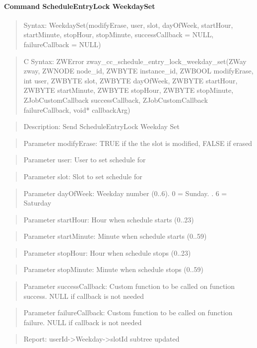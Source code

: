 \paragraph{Command ScheduleEntryLock WeekdaySet}
\begin{quote}Syntax: WeekdaySet(modifyErase, user, slot, dayOfWeek, startHour, startMinute, stopHour, stopMinute, successCallback = NULL, failureCallback = NULL)\end{quote}
\begin{quote}C Syntax: ZWError zway\_cc\_schedule\_entry\_lock\_weekday\_set(ZWay zway, ZWNODE node\_id, ZWBYTE instance\_id, ZWBOOL modifyErase, int user, ZWBYTE slot, ZWBYTE dayOfWeek, ZWBYTE startHour, ZWBYTE startMinute, ZWBYTE stopHour, ZWBYTE stopMinute, ZJobCustomCallback successCallback, ZJobCustomCallback failureCallback, void* callbackArg)\end{quote}
\begin{quote}Description: Send ScheduleEntryLock Weekday Set\end{quote}
\begin{quote}Parameter modifyErase: TRUE if the the slot is modified, FALSE if erased\end{quote}
\begin{quote}Parameter user: User to set schedule for\end{quote}
\begin{quote}Parameter slot: Slot to set schedule for\end{quote}
\begin{quote}Parameter dayOfWeek: Weekday number (0..6). 0 = Sunday. . 6 = Saturday\end{quote}
\begin{quote}Parameter startHour: Hour when schedule starts (0..23)\end{quote}
\begin{quote}Parameter startMinute: Minute when schedule starts (0..59)\end{quote}
\begin{quote}Parameter stopHour: Hour when schedule stops (0..23)\end{quote}
\begin{quote}Parameter stopMinute: Minute when schedule stops (0..59)\end{quote}
\begin{quote}Parameter successCallback: Custom function to be called on function success. NULL if callback is not needed\end{quote}
\begin{quote}Parameter failureCallback: Custom function to be called on function failure. NULL if callback is not needed\end{quote}
\begin{quote}Report: userId->Weekday->slotId subtree updated\end{quote}

